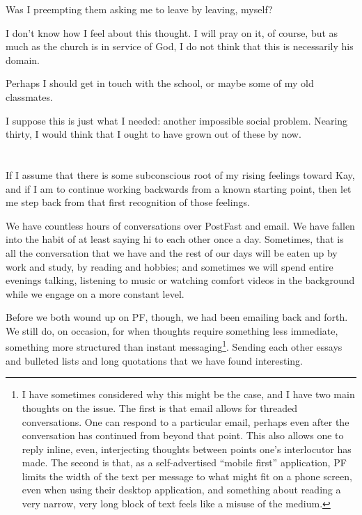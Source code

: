 Was I preempting them asking me to leave by leaving, myself?

I don't know how I feel about this thought. I will pray on it, of course, but as much as the church is in service of God, I do not think that this is necessarily his domain.

Perhaps I should get in touch with the school, or maybe some of my old classmates.

I suppose this is just what I needed: another impossible social problem. Nearing thirty, I would think that I ought to have grown out of these by now.

\section{}

If I assume that there is some subconscious root of my rising feelings toward Kay, and if I am to continue working backwards from a known starting point, then let me step back from that first recognition of those feelings.

We have countless hours of conversations over PostFast and email. We have fallen into the habit of at least saying hi to each other once a day. Sometimes, that is all the conversation that we have and the rest of our days will be eaten up by work and study, by reading and hobbies; and sometimes we will spend entire evenings talking, listening to music or watching comfort videos in the background while we engage on a more constant level.

Before we both wound up on PF, though, we had been emailing back and forth. We still do, on occasion, for when thoughts require something less immediate, something more structured than instant messaging\footnote{I have sometimes considered why this might be the case, and I have two main thoughts on the issue. The first is that email allows for threaded conversations. One can respond to a particular email, perhaps even after the conversation has continued from beyond that point. This also allows one to reply inline, even, interjecting thoughts between points one's interlocutor has made. The second is that, as a self-advertised ``mobile first'' application, PF limits the width of the text per message to what might fit on a phone screen, even when using their desktop application, and something about reading a very narrow, very long block of text feels like a misuse of the medium.}. Sending each other essays and bulleted lists and long quotations that we have found interesting.

